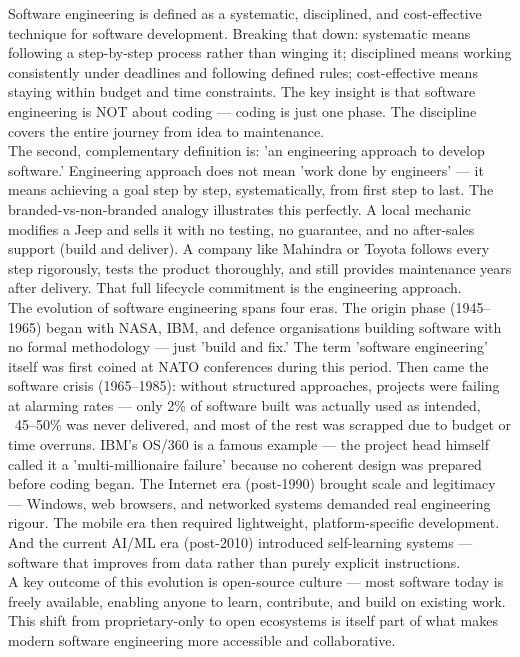 \documentclass{report}
\begin{document}
Software engineering is defined as a systematic, disciplined, and cost-effective technique for software development. Breaking that down: systematic means following a step-by-step process rather than winging it; disciplined means working consistently under deadlines and following defined rules; cost-effective means staying within budget and time constraints. The key insight is that software engineering is NOT about coding — coding is just one phase. The discipline covers the entire journey from idea to maintenance.\\
The second, complementary definition is: 'an engineering approach to develop software.' Engineering approach does not mean 'work done by engineers' — it means achieving a goal step by step, systematically, from first step to last. The branded-vs-non-branded analogy illustrates this perfectly. A local mechanic modifies a Jeep and sells it with no testing, no guarantee, and no after-sales support (build and deliver). A company like Mahindra or Toyota follows every step rigorously, tests the product thoroughly, and still provides maintenance years after delivery. That full lifecycle commitment is the engineering approach.\\
The evolution of software engineering spans four eras. The origin phase (1945–1965) began with NASA, IBM, and defence organisations building software with no formal methodology — just 'build and fix.' The term 'software engineering' itself was first coined at NATO conferences during this period. Then came the software crisis (1965–1985): without structured approaches, projects were failing at alarming rates — only 2\% of software built was actually used as intended, ~45–50\% was never delivered, and most of the rest was scrapped due to budget or time overruns. IBM's OS/360 is a famous example — the project head himself called it a 'multi-millionaire failure' because no coherent design was prepared before coding began. The Internet era (post-1990) brought scale and legitimacy — Windows, web browsers, and networked systems demanded real engineering rigour. The mobile era then required lightweight, platform-specific development. And the current AI/ML era (post-2010) introduced self-learning systems — software that improves from data rather than purely explicit instructions.\\
A key outcome of this evolution is open-source culture — most software today is freely available, enabling anyone to learn, contribute, and build on existing work. This shift from proprietary-only to open ecosystems is itself part of what makes modern software engineering more accessible and collaborative.
\end{document}
